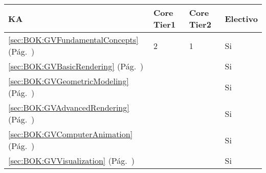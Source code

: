 \begin{center}
\begin{tabularx}{\textwidth}{|X|p{1cm}|p{1cm}|p{1.4cm}|}\hline
\textbf{\acf{KA}} & \textbf{Core Tier1} & \textbf{Core Tier2} & \textbf{Electivo} \\ \hline
\ref{sec:BOK:GVFundamentalConcepts} \htmlref{\GVFundamentalConcepts}{sec:BOK:GVFundamentalConcepts}\xspace (Pág.~\pageref{sec:BOK:GVFundamentalConcepts}) & 2 & 1 & Si \\ \hline
\ref{sec:BOK:GVBasicRendering} \htmlref{\GVBasicRendering}{sec:BOK:GVBasicRendering}\xspace (Pág.~\pageref{sec:BOK:GVBasicRendering}) & ~ & ~ & Si \\ \hline
\ref{sec:BOK:GVGeometricModeling} \htmlref{\GVGeometricModeling}{sec:BOK:GVGeometricModeling}\xspace (Pág.~\pageref{sec:BOK:GVGeometricModeling}) & ~ & ~ & Si \\ \hline
\ref{sec:BOK:GVAdvancedRendering} \htmlref{\GVAdvancedRendering}{sec:BOK:GVAdvancedRendering}\xspace (Pág.~\pageref{sec:BOK:GVAdvancedRendering}) & ~ & ~ & Si \\ \hline
\ref{sec:BOK:GVComputerAnimation} \htmlref{\GVComputerAnimation}{sec:BOK:GVComputerAnimation}\xspace (Pág.~\pageref{sec:BOK:GVComputerAnimation}) & ~ & ~ & Si \\ \hline
\ref{sec:BOK:GVVisualization} \htmlref{\GVVisualization}{sec:BOK:GVVisualization}\xspace (Pág.~\pageref{sec:BOK:GVVisualization}) & ~ & ~ & Si \\ \hline
\end{tabularx}
\end{center}
